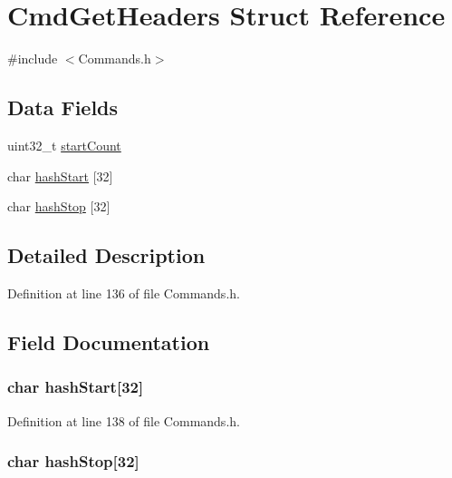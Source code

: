 \hypertarget{struct_cmd_get_headers}{
\section{CmdGetHeaders Struct Reference}
\label{struct_cmd_get_headers}
}


{\ttfamily \#include $<$Commands.h$>$}

\subsection*{Data Fields}
\begin{DoxyCompactItemize}
\item 
uint32\_\-t \hyperlink{struct_cmd_get_headers_a3393c33019315a8d7ff4d5e48b0577e8}{startCount}
\item 
char \hyperlink{struct_cmd_get_headers_afb278e99e58307608e33751cd490c97b}{hashStart} \mbox{[}32\mbox{]}
\item 
char \hyperlink{struct_cmd_get_headers_aa16ea670ce42c626f461fc49f74ddcd3}{hashStop} \mbox{[}32\mbox{]}
\end{DoxyCompactItemize}


\subsection{Detailed Description}


Definition at line 136 of file Commands.h.



\subsection{Field Documentation}
\hypertarget{struct_cmd_get_headers_afb278e99e58307608e33751cd490c97b}{
\subsubsection[{hashStart}]{\setlength{\rightskip}{0pt plus 5cm}char {\bf hashStart}\mbox{[}32\mbox{]}}}
\label{struct_cmd_get_headers_afb278e99e58307608e33751cd490c97b}


Definition at line 138 of file Commands.h.

\hypertarget{struct_cmd_get_headers_aa16ea670ce42c626f461fc49f74ddcd3}{
\subsubsection[{hashStop}]{\setlength{\rightskip}{0pt plus 5cm}char {\bf hashStop}\mbox{[}32\mbox{]}}}
\label{struct_cmd_get_headers_aa16ea670ce42c626f461fc49f74ddcd3}


